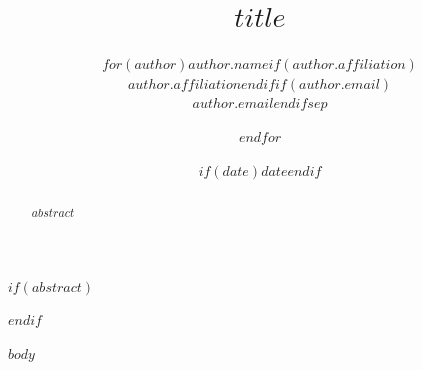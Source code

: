 \documentclass[$if(fontsize)$$fontsize$$else$11pt$endif$,$if(papersize)$$papersize$$else$a4$endif$paper]{article}
\title{$title$}
\author{$for(author)$$author.name$$if(author.affiliation)$\\ $author.affiliation$$endif$$if(author.email)$\\ $author.email$$endif$$sep$ \and $endfor$}
\date{$if(date)$$date$$endif$}
\begin{document}
\maketitle
$if(abstract)$
\begin{abstract}
$abstract$
\end{abstract}
$endif$

$body$
\end{document}
